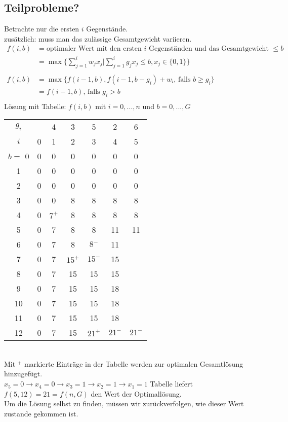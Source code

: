 \subsection*{Teilprobleme?}
Betrachte nur die ersten $i$ Gegenstände. \\
zusätzlich: muss man das zulässige Gesamtgewicht variieren.\\
\begin{align*}
f(i,b) &= \text{optimaler Wert mit den ersten } i \text{ Gegenständen und das Gesamtgewicht }\leq b\\
&= \max\{\sum_{j=1}^{i} w_jx_j | \sum_{j=1}^{i}g_jx_j \leq b, x_j \in \{0,1\}\}\\
\\
f(i,b) &= \max\{f(i-1,b), f(i-1,b-g_i) + w_i \text{, falls } b \geq g_i\}\\
&= f(i-1,b)\text{, falls } g_i > b\\
\end{align*}
Lösung mit Tabelle: $f(i,b)$ mit $i = 0,...,n $ und $b = 0,..., G$\\
\begin{tabular}{c|cccccc|}
$g_i$ & & 4 & 3 & 5 & 2 & 6\\
$i$ & 0 & 1 & 2 & 3 & 4 & 5\\
\hline
$b=$ 0 &  0& 0 &  0& 0 &0 &0\\
1 & 0 &  0& 0 &  0& 0&0\\
2 &  0&  0&  0&  0& 0&0\\
3 &  0&  0&  8&  8& 8&8\\
4 &  0&  $7^+$&  8&  8& 8&8\\
5 &  0&  7&  8&  8& 11&11\\
6 &  0&  7&  8&  $8^-$& 11&\\
7 &  0&  7&  $15^+$&  $15^-$& 15&\\
8 &  0&  7&  15&  15& 15&\\
9 &  0&  7&  15&  15& 18&\\
10 &  0& 7 &  15&  15& 18&\\
11 &  0&  7&  15&  15& 18&\\
12 &  0&  7&  15&  $21^+$& $21^-$&$21^-$\\
\hline
\end{tabular}
\\
Mit $^+$ markierte Einträge in der Tabelle werden zur optimalen Gesamtlösung hinzugefügt.\\
$x_5 = 0\rightarrow x_4 = 0 \rightarrow x_3 = 1 \rightarrow x_2 = 1 \rightarrow x_1 = 1$
Tabelle liefert $f(5,12) = 21 = f(n,G)$ den Wert der Optimallösung.\\
Um die Lösung selbst zu finden, müssen wir zurückverfolgen, wie dieser Wert zustande gekommen ist.\\

